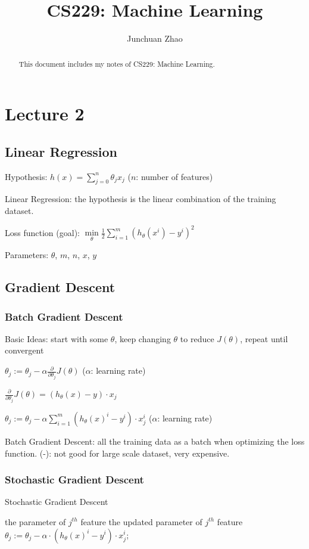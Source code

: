 \documentclass{article}
\title{CS229: Machine Learning}
\author{Junchuan Zhao}
\begin{document}
\maketitle

\begin{abstract}
This document includes my notes of CS229: Machine Learning.
\end{abstract}

\section{Lecture 2}
\subsection{Linear Regression}
Hypothesis: $h(x) = \sum\limits_{j=0}^n \theta_j x_j$ ($n$: number of features)

\noindent
Linear Regression: the hypothesis is the linear combination of the training dataset.

\noindent
Loss function (goal): $\min\limits_{\theta} \frac{1}{2} \sum\limits_{i=1}^m (h_{\theta}(x^i)-y^i)^2$

\noindent
Parameters: $\theta$, $m$, $n$, $x$, $y$

\subsection{Gradient Descent}
\subsubsection{Batch Gradient Descent}
Basic Ideas: start with some $\theta$, keep changing $\theta$ to reduce $J(\theta)$, repeat until convergent

\noindent
$\theta_j := \theta_j-\alpha\frac{\partial}{\partial \theta_j} J(\theta)$ ($\alpha$: learning rate)

\noindent
$\frac{\partial}{\partial \theta_j} J(\theta) = (h_\theta(x) - y) \cdot x_j$

\noindent
$\theta_j := \theta_j-\alpha \sum\limits_{i=1}^m (h_\theta(x)^i - y^i) \cdot x_j^i$ ($\alpha$: learning rate)

\noindent
Batch Gradient Descent: all the training data as a batch when optimizing the loss function.
(-): not good for large scale dataset, very expensive.

\subsubsection{Stochastic Gradient Descent}
\begin{algorithm}[h]
    \caption{Stochastic Gradient Descent}
  \label{alg::conjugateGradient}
  \begin{algorithmic}[1]
    \Require
    the parameter of $j^{th}$ feature
    \Ensure
    the updated parameter of $j^{th}$ feature
        \State $\theta_j := \theta_j-\alpha \cdot (h_\theta(x)^i - y^i) \cdot x_j^i$;
    \EndFor
 
  \end{algorithmic}
\end{algorithm}
\end{document}
